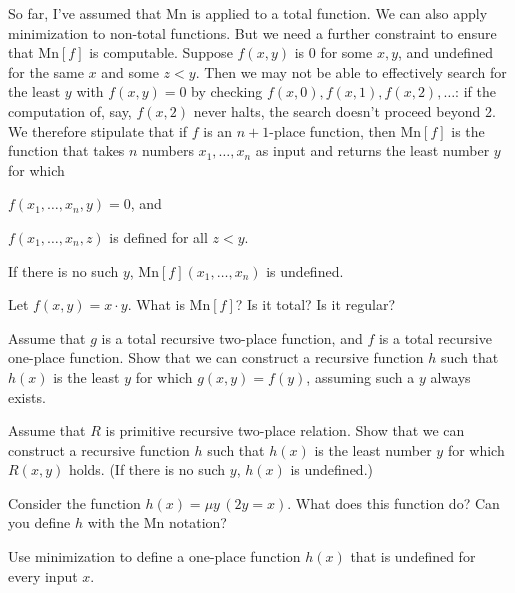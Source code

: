 So far,
I've assumed that $\mathrm{Mn}$ is applied to a total function.
We can also apply minimization to non-total functions.
But we need a further constraint to ensure that $\mathrm{Mn}[f]$ is computable.
Suppose $f(x,y)$ is 0 for some $x,y$,
and undefined for the same $x$ and some $z < y$.
Then we may not be able to effectively search for the least $y$ with $f(x,y) = 0$
by checking $f(x,0), f(x,1), f(x,2), \ldots$:
if the computation of, say, $f(x,2)$ never halts,
the search doesn't proceed beyond 2.
We therefore stipulate that
if $f$ is an $n+1$-place function, then
$\mathrm{Mn}[f]$ is the function that
takes $n$ numbers $x_1, \ldots, x_n$ as input and
returns the least number $y$ for which
\begin{cenumerate}
  \item[(i)] $f(x_1, \ldots, x_n, y) = 0$, and
  \item[(ii)] $f(x_1, \ldots, x_n, z)$ is defined for all $z < y$.
\end{cenumerate}
If there is no such $y$, $\mathrm{Mn}[f](x_1, \ldots, x_n)$ is undefined.

\begin{exercise}
  Let $f(x,y) = x \cdot y$.
  What is $\mathrm{Mn}[f]$?
  Is it total? Is it regular?
\end{exercise}

\begin{exercise}
  Assume that $g$ is a total recursive two-place function,
  and $f$ is a total recursive one-place function.
  Show that we can construct a recursive function $h$ such that
  $h(x)$ is the least $y$ for which $g(x,y) = f(y)$,
  assuming such a $y$ always exists.
\end{exercise}

\begin{exercise}
  Assume that $R$ is primitive recursive two-place relation.
  Show that we can construct a recursive function $h$ such that
  $h(x)$ is the least number $y$ for which $R(x,y)$ holds.
  (If there is no such $y$, $h(x)$ is undefined.)
\end{exercise}

\begin{exercise}
  Consider the function $h(x) = \mu y \,(2y = x)$.
  What does this function do?
  Can you define $h$ with the $\mathrm{Mn}$ notation?
\end{exercise}

\begin{exercise}
  Use minimization to define a one-place function $h(x)$ that is undefined for every input $x$.
\end{exercise}

